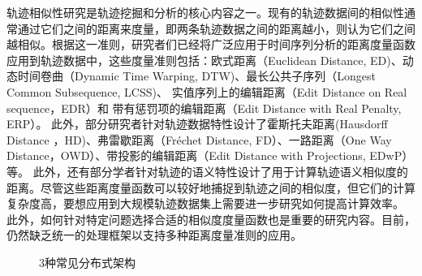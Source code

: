         轨迹相似性研究是轨迹挖掘和分析的核心内容之一。现有的轨迹数据间的相似性通常通过它们之间的距离来度量，即两条轨迹数据之间的距离越小，则认为它们之间越相似。根据这一准则，研究者们已经将广泛应用于时间序列分析的距离度量函数应用到轨迹数据中，这些度量准则包括：欧式距离（Euclidean Distance, ED)\cite{DTKST}、动态时间卷曲（Dynamic Time Warping, DTW)\cite{bandwidth}、最长公共子序列（Longest Common Subsequence, LCSS)\cite{crowdsourced,SmartTrace}、
         实值序列上的编辑距离（Edit Distance on Real sequence，EDR）\cite{EDR}和 带有惩罚项的编辑距离（Edit Distance with Real Penalty, ERP）\cite{ERP}。
         此外，部分研究者针对轨迹数据特性设计了霍斯托夫距离(Hausdorff Distance ，HD)\cite{MaoSJZZ16}、弗雷歇距离（Fréchet Distance, FD）\cite{ZhuLYZHZ10,Guo2017}、一路距离（One Way Distance，OWD）\cite{LinS08}、带投影的编辑距离（Edit Distance with Projections, EDwP）等。
         此外，还有部分学者针对轨迹的语义特性设计了用于计算轨迹语义相似度的距离\cite{Liu012,ZhaoX11,ZhengYZXSZ15}。尽管这些距离度量函数可以较好地捕捉到轨迹之间的相似度，但它们的计算复杂度高，要想应用到大规模轨迹数据集上需要进一步研究如何提高计算效率。
         此外，如何针对特定问题选择合适的相似度度量函数也是重要的研究内容\cite{Magdy2016Review,TooheyD15}。目前，仍然缺乏统一的处理框架以支持多种距离度量准则的应用。 
         \begin{figure}
         	\centering
         	\caption{3种常见分布式架构}
         	\label{fig:DistributeArc}
         \end{figure}
         
